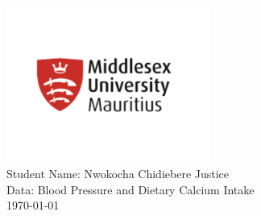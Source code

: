 \begin{titlepage}
\centering
\vspace*{1cm} %
\includegraphics[width=0.5\textwidth]{sch_banner.png}\\[2cm] %
{\large Student Name: Nwokocha Chidiebere Justice}\\[0.1cm]
{\large Data: Blood Pressure and Dietary Calcium Intake}\\
{\large \today}\\
\vfill
\end{titlepage}